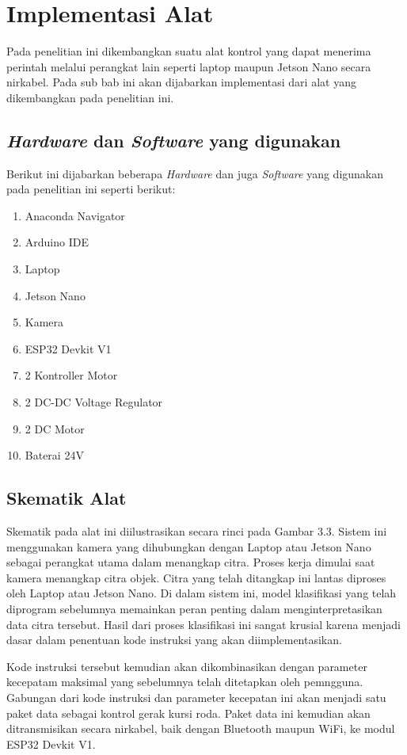 \section{Implementasi Alat}
\label{sec:implementasi alat}

Pada penelitian ini dikembangkan suatu alat kontrol yang dapat menerima perintah melalui perangkat lain seperti laptop maupun Jetson Nano secara nirkabel. Pada sub bab ini akan dijabarkan implementasi dari alat yang dikembangkan pada penelitian ini.

\subsection{\emph{Hardware} dan \emph{Software} yang digunakan}
Berikut ini dijabarkan beberapa \emph{Hardware} dan juga \emph{Software} yang digunakan pada penelitian ini seperti berikut:
\begin{enumerate}
    \item Anaconda Navigator
    \item Arduino IDE 
    \item Laptop 
    \item Jetson Nano
    \item Kamera
    \item ESP32 Devkit V1
    \item 2 Kontroller Motor
    \item 2 DC-DC Voltage Regulator
    \item 2 DC Motor
    \item Baterai 24V
\end{enumerate}

\subsection{Skematik Alat}
Skematik pada alat ini diilustrasikan secara rinci pada Gambar 3.3. Sistem ini menggunakan kamera yang dihubungkan dengan Laptop atau Jetson Nano sebagai perangkat utama dalam menangkap citra. Proses kerja dimulai saat kamera menangkap citra objek. Citra yang telah ditangkap ini lantas diproses oleh Laptop atau Jetson Nano. Di dalam sistem ini, model klasifikasi yang telah diprogram sebelumnya memainkan peran penting dalam menginterpretasikan data citra tersebut. Hasil dari proses klasifikasi ini sangat krusial karena menjadi dasar dalam penentuan kode instruksi yang akan diimplementasikan.

Kode instruksi tersebut kemudian akan dikombinasikan dengan parameter kecepatam maksimal yang sebelumnya telah ditetapkan oleh pemngguna. Gabungan dari kode instruksi dan parameter kecepatan ini akan menjadi satu paket data sebagai kontrol gerak kursi roda. Paket data ini kemudian akan ditransmisikan secara nirkabel, baik dengan Bluetooth maupun WiFi, ke modul ESP32 Devkit V1. 

